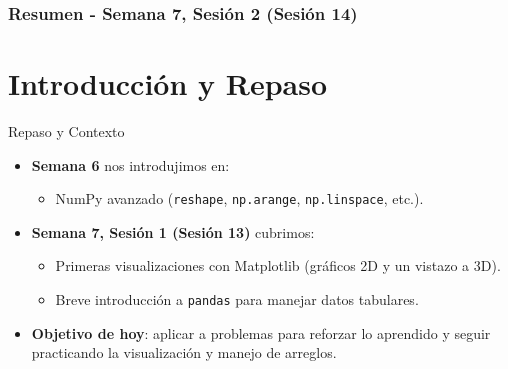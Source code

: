 \documentclass[10pt]{beamer}
\begin{document}
\myfront{}

\begin{frame}
  \titlepage
\end{frame}

\begin{frame}
  \frametitle{Resumen - Semana 7, Sesión 2 (Sesión 14)}
  \tableofcontents
\end{frame}


\section{Introducción y Repaso}

\begin{frame}{Repaso y Contexto}
  \begin{itemize}
    \item \textbf{Semana 6} nos introdujimos en:
      \begin{itemize}
        \item NumPy avanzado (\texttt{reshape}, \texttt{np.arange}, \texttt{np.linspace}, etc.).
      \end{itemize}
    \item \textbf{Semana 7, Sesión 1 (Sesión 13)} cubrimos:
      \begin{itemize}
        \item Primeras visualizaciones con Matplotlib (gráficos 2D y un vistazo a 3D).
        \item Breve introducción a \texttt{pandas} para manejar datos tabulares.
      \end{itemize}
    \item \textbf{Objetivo de hoy}: aplicar a  problemas para reforzar lo aprendido y seguir practicando la visualización y manejo de arreglos.
  \end{itemize}
\end{frame}
\end{document}

